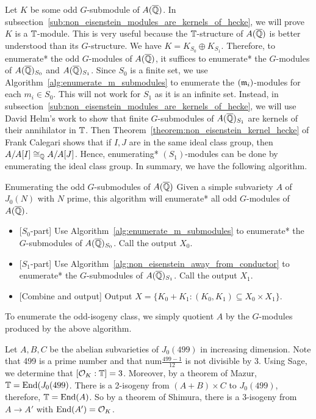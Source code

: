 \documentclass{article}
\begin{document}
Let $K$ be some odd $G$-submodule of $A(\overline{\mathbb{Q}})$. In
subsection~\ref{sub:non_eisenstein_modules_are_kernels_of_hecke}, we will prove
$K$ is a $\mathbb{T}$-module. This is very useful because the $\mathbb{T}$-structure of
$A(\overline{\mathbb{Q}})$ is better understood than its $G$-structure. We have
$K=K_{S_0}\oplus K_{S_1}$. Therefore, to enumerate* the odd $G$-modules of
$A(\overline{\mathbb{Q}})$, it suffices to enumerate* the $G$-modules of $A(\overline{\mathbb{Q}})_{S_0}$ and
$A(\overline{\mathbb{Q}})_{S_1}$. Since $S_0$ is a finite set, we use
Algorithm~\ref{alg:enumerate_m_submodules} to enumerate the $(\mathfrak{m}_i)$-modules for
each $m_i\in S_0$. This will not work for $S_1$ as it is an infinite set.
Instead, in subsection~\ref{sub:non_eisenstein_modules_are_kernels_of_hecke},
we will use David Helm's work to show that finite $G$-submodules of
$A(\overline{\mathbb{Q}})_{S_1}$ are kernels of their annihilator in $\mathbb{T}$. Then
Theorem~\ref{theorem:non_eisenstein_kernel_hecke} of Frank Calegari shows that
if $I,J$ are in the same ideal class group, then $A/A[I]\cong_{\mathbb{Q}} A/A[J]$.
Hence, enumerating* $(S_1)$-modules can be done by enumerating the ideal class
group. In summary, we have the following algorithm.
\begin{algorithm}{Enumerating the odd $G$-submodules of $A(\overline{\mathbb{Q}})$}
    Given a simple subvariety $A$ of $J_0(N)$ with $N$ prime, this algorithm
    will enumerate* all odd $G$-modules of $A(\overline{\mathbb{Q}})$. 
    \begin{itemize}
        \item{} [$S_0$-part]
            Use Algorithm~\ref{alg:enumerate_m_submodules} to enumerate* the
            $G$-submodules of $A(\overline{\mathbb{Q}})_{S_0}$. Call the output $X_0$.
        \item{} [$S_1$-part]
            Use Algorithm~\ref{alg:non_eisenstein_away_from_conductor} to
            enumerate* the $G$-submodules of $A(\overline{\mathbb{Q}})_{S_1}$. Call the output
            $X_1$.
        \item{}\label{item:combine} [Combine and output]
            Output $X=\{K_0+K_1:(K_0,K_1)\subseteq X_0\times X_1\}$.
    \end{itemize}
\end{algorithm}
To enumerate the odd-isogeny class, we simply quotient $A$ by the $G$-modules
produced by the above algorithm.

\begin{example}
    Let $A,B,C$ be the abelian subvarieties of $J_0(499)$ in increasing
    dimension. Note that 499 is a prime number and that
    $\mathrm{num}\frac{499-1}{12}$ is not divisible by 3. Using Sage, we
    determine that $[\mathcal{O}_K:\mathbb{T}]=3$. Moreover, by a theorem of Mazur,
    $\mathbb{T}=\operatorname{End}(J_0(499)$. There is a 2-isogeny from $(A+B)\times C$ to
    $J_0(499)$, therefore, $\mathbb{T}=\operatorname{End}(A)$. So by a theorem of Shimura, there is
    a 3-isogeny from $A\to A'$ with $\operatorname{End}(A')=\mathcal{O}_K$.
\end{example}
\end{document}

